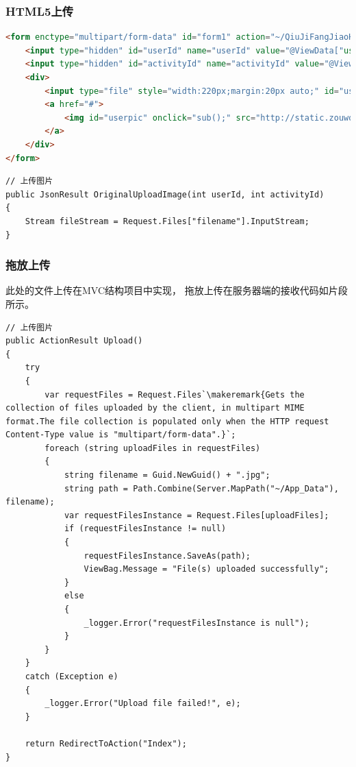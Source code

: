 \documentclass{book}
\newcounter{coderemarks}   %
\newcommand{\circlemark}[1]{%
\tikz\node[text=white,font=\sffamily\bfseries,inner sep=0.2mm,draw,circle,fill=black]{#1};}
\newcommand{\makeremark}[1]{%
\circlemark{\arabic{coderemarks}}%
\global \expandafter\def \csname codebox\the\value{coderemarks}\endcsname{#1}%
\stepcounter{coderemarks}}
\begin{document}
\subsubsection{HTML5上传}

\begin{lstlisting}[language=HTML]
<form enctype="multipart/form-data" id="form1" action="~/QiuJiFangJiaoHui/OriginalUploadImage" method="post">
    <input type="hidden" id="userId" name="userId" value="@ViewData["userId"]" />
    <input type="hidden" id="activityId" name="activityId" value="@ViewData["activityId"]" />
    <div>
        <input type="file" style="width:220px;margin:20px auto;" id="userUploadFile" name="filename" accept="image/*" class='btn btn-warning' />
        <a href="#">
            <img id="userpic" onclick="sub();" src="http://static.zouwo.com/lottery/1.02/images/a16.jpg" style="width:100%">
        </a>
    </div>
</form>
\end{lstlisting}


\begin{lstlisting}[language={[Sharp]C}]
// 上传图片
public JsonResult OriginalUploadImage(int userId, int activityId)
{   
    Stream fileStream = Request.Files["filename"].InputStream;
}
\end{lstlisting}

\subsubsection{拖放上传}

此处的文件上传在MVC结构项目中实现，
拖放上传在服务器端的接收代码如片段所示。

\begin{lstlisting}[language={[Sharp]C}]
// 上传图片
public ActionResult Upload()
{
    try
    {
        var requestFiles = Request.Files`\makeremark{Gets the collection of files uploaded by the client, in multipart MIME format.The file collection is populated only when the HTTP request Content-Type value is "multipart/form-data".}`;
        foreach (string uploadFiles in requestFiles)
        {
            string filename = Guid.NewGuid() + ".jpg";
            string path = Path.Combine(Server.MapPath("~/App_Data"), filename);
            var requestFilesInstance = Request.Files[uploadFiles];
            if (requestFilesInstance != null)
            {
                requestFilesInstance.SaveAs(path);
                ViewBag.Message = "File(s) uploaded successfully";
            }
            else
            {
                _logger.Error("requestFilesInstance is null");
            }
        }
    }
    catch (Exception e)
    {
        _logger.Error("Upload file failed!", e);
    }

    return RedirectToAction("Index");
}
\end{lstlisting}
\end{document}
